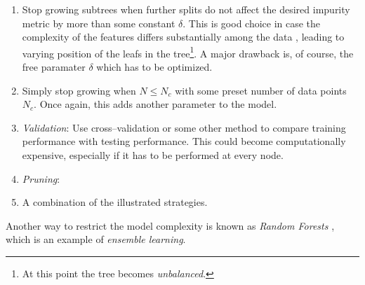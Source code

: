 \begin{enumerate}
\item \label{itm:constant-metric} Stop growing subtrees when further splits do not affect the desired impurity metric by more than some constant $\delta$. This is good choice in case the complexity of the features differs substantially among the data \citep{duda2001}, leading to varying position of the leafs in the tree\footnote{At this point the tree becomes \emph{unbalanced}.}. A major drawback is, of course, the free paramater $\delta$ which has to be optimized.
\item \label{itm:constant-data-points} Simply stop growing when $N \le N_c$ with some preset number of data points $N_c$. Once again, this adds another parameter to the model.
\item \label{itm:validation} \emph{Validation}: Use cross--validation or some other method to compare training performance with testing performance. This could become computationally expensive, especially if it has to be performed at every node.
\item \label{itm:pruning} \emph{Pruning}: %
\item A combination of the illustrated strategies.
\end{enumerate}







Another way to restrict the model complexity is known as \emph{Random Forests} \citep{breiman2001}, which is an example of \emph{ensemble learning}.


